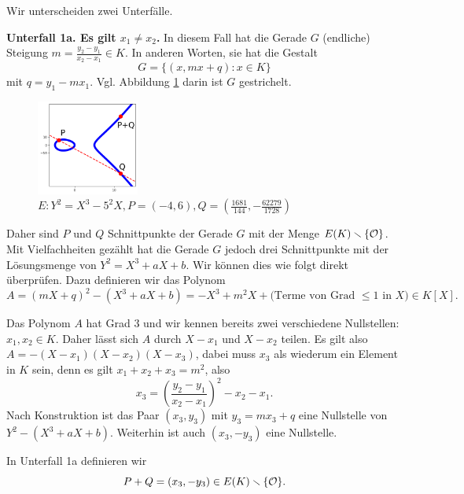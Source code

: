Wir unterscheiden zwei Unterfälle. 

\textbf{Unterfall 1a. Es gilt $x_1\not=x_2$.} In diesem Fall hat die
Gerade $G$ (endliche) Steigung $m = \frac{y_2-y_1}{x_2-x_1}\in K$. In
anderen Worten, sie hat die Gestalt
\begin{equation*}
  G = \{(x,mx+q) : x\in K \}
\end{equation*}
mit $q=y_1-m x_1$. Vgl. Abbildung \ref{fig:unterfall1a} darin ist $G$
gestrichelt.

\begin{figure}
  \centering    
  \caption{$E: Y^2 = X^3-5^2 X,P = (-4,6),Q = (\frac{1681}{144},-\frac{62279}{1728})$}
  \label{fig:unterfall1a}
  \includegraphics[width=0.3\textwidth]{./plots/unterfall1a.png}
\end{figure}
 
Daher sind $P$ und $Q$ Schnittpunkte der Gerade $G$ mit der Menge
$E(K)\smallsetminus \{{\mathcal O}\}$. Mit Vielfachheiten gezählt hat die Gerade $G$
jedoch drei Schnittpunkte mit der Lösungsmenge von $Y^2=X^3+aX+b$. Wir
können dies wie folgt direkt überprüfen. Dazu definieren wir
das Polynom
\begin{equation*}
  A = (mX+q)^2 - (X^3+aX+b) =-X^3+m^2X +\text{(Terme von Grad $\le 1$ in $X$)}
  \in K[X]. 
\end{equation*}

Das Polynom $A$ hat Grad $3$  und wir kennen bereits zwei verschiedene
Nullstellen: $x_1,x_2\in K$. Daher lässt sich $A$ durch $X-x_1$ und
$X-x_2$ teilen. Es gilt also $A = -(X-x_1)(X-x_2)(X-x_3)$, dabei muss
$x_3$ als wiederum ein Element in $K$ sein, denn es gilt $x_1+x_2+x_3
= m^2$, also
\begin{equation*}
  x_3 = \left(\frac{y_2-y_1}{x_2-x_1}\right)^2-x_2-x_1.
\end{equation*}
Nach Konstruktion ist das Paar $(x_3,y_3)$ mit  $y_3=mx_3+q$ eine
Nullstelle von $Y^2-(X^3+aX+b)$. Weiterhin ist auch $(x_3,-y_3)$ eine
Nullstelle.

In Unterfall 1a definieren wir
\begin{equation*}
  P+Q = (x_3,-y_3) \in E(K)\smallsetminus \{{\mathcal O}\}.
\end{equation*}

